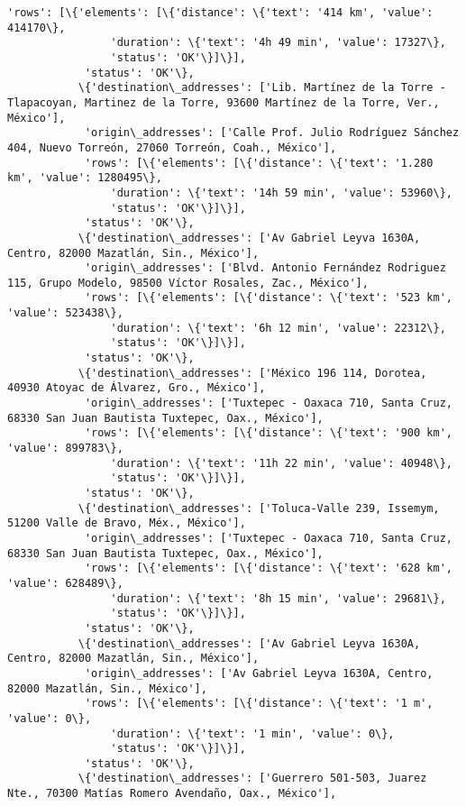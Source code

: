 \documentclass[11pt]{article}
\begin{document}
\begin{Verbatim}[commandchars=\\\{\}]
            'rows': [\{'elements': [\{'distance': \{'text': '414 km', 'value': 414170\},
                'duration': \{'text': '4h 49 min', 'value': 17327\},
                'status': 'OK'\}]\}],
            'status': 'OK'\},
           \{'destination\_addresses': ['Lib. Martínez de la Torre - Tlapacoyan, Martinez de la Torre, 93600 Martínez de la Torre, Ver., México'],
            'origin\_addresses': ['Calle Prof. Julio Rodríguez Sánchez 404, Nuevo Torreón, 27060 Torreón, Coah., México'],
            'rows': [\{'elements': [\{'distance': \{'text': '1.280 km', 'value': 1280495\},
                'duration': \{'text': '14h 59 min', 'value': 53960\},
                'status': 'OK'\}]\}],
            'status': 'OK'\},
           \{'destination\_addresses': ['Av Gabriel Leyva 1630A, Centro, 82000 Mazatlán, Sin., México'],
            'origin\_addresses': ['Blvd. Antonio Fernández Rodriguez 115, Grupo Modelo, 98500 Víctor Rosales, Zac., México'],
            'rows': [\{'elements': [\{'distance': \{'text': '523 km', 'value': 523438\},
                'duration': \{'text': '6h 12 min', 'value': 22312\},
                'status': 'OK'\}]\}],
            'status': 'OK'\},
           \{'destination\_addresses': ['México 196 114, Dorotea, 40930 Atoyac de Álvarez, Gro., México'],
            'origin\_addresses': ['Tuxtepec - Oaxaca 710, Santa Cruz, 68330 San Juan Bautista Tuxtepec, Oax., México'],
            'rows': [\{'elements': [\{'distance': \{'text': '900 km', 'value': 899783\},
                'duration': \{'text': '11h 22 min', 'value': 40948\},
                'status': 'OK'\}]\}],
            'status': 'OK'\},
           \{'destination\_addresses': ['Toluca-Valle 239, Issemym, 51200 Valle de Bravo, Méx., México'],
            'origin\_addresses': ['Tuxtepec - Oaxaca 710, Santa Cruz, 68330 San Juan Bautista Tuxtepec, Oax., México'],
            'rows': [\{'elements': [\{'distance': \{'text': '628 km', 'value': 628489\},
                'duration': \{'text': '8h 15 min', 'value': 29681\},
                'status': 'OK'\}]\}],
            'status': 'OK'\},
           \{'destination\_addresses': ['Av Gabriel Leyva 1630A, Centro, 82000 Mazatlán, Sin., México'],
            'origin\_addresses': ['Av Gabriel Leyva 1630A, Centro, 82000 Mazatlán, Sin., México'],
            'rows': [\{'elements': [\{'distance': \{'text': '1 m', 'value': 0\},
                'duration': \{'text': '1 min', 'value': 0\},
                'status': 'OK'\}]\}],
            'status': 'OK'\},
           \{'destination\_addresses': ['Guerrero 501-503, Juarez Nte., 70300 Matías Romero Avendaño, Oax., México'],

\end{Verbatim}
\end{document}
